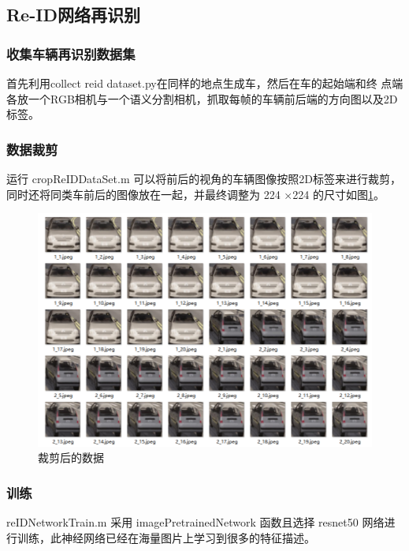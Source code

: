 \subsection{Re-ID网络再识别}
\subsubsection{收集车辆再识别数据集}

首先利用collect reid dataset.py在同样的地点生成车，然后在车的起始端和终 点端各放一个RGB相机与一个语义分割相机，抓取每帧的车辆前后端的方向图以及2D标签。

\subsubsection{数据裁剪}

运行 cropReIDDataSet.m 可以将前后的视角的车辆图像按照2D标签来进行裁剪，同时还将同类车前后的图像放在一起，并最终调整为 224 ×224 的尺寸如图\ref{fig:p14}。



\begin{figure}[htbp] %
	\centering
	\includegraphics[width=1\textwidth]{p14} %
	\caption{裁剪后的数据} %
	\label{fig:p14} %
\end{figure}




\subsubsection{训练}
reIDNetworkTrain.m 采用 imagePretrainedNetwork 函数且选择 resnet50 网络进行训练，此神经网络已经在海量图片上学习到很多的特征描述。
